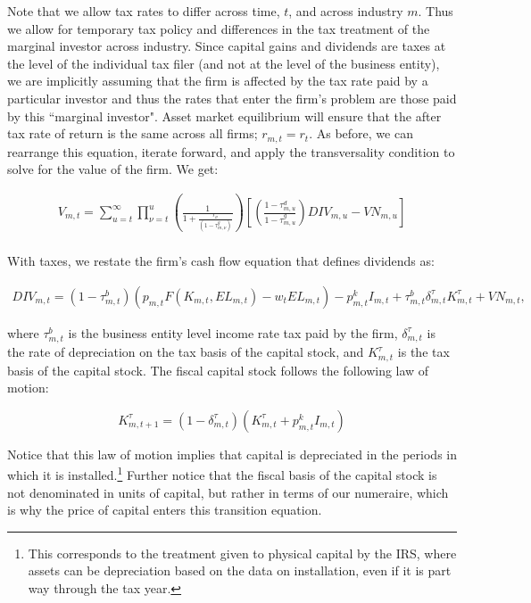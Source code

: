 \documentclass[letterpaper,12pt]{article}
\theoremstyle{definition}
\begin{document}
\begin{spacing}{1.5}
Note that we allow tax rates to differ across time, $t$, and across industry $m$. Thus we allow for temporary tax policy and differences in the tax treatment of the marginal investor across industry.  Since capital gains and dividends are taxes at the level of the individual tax filer (and not at the level of the business entity), we are implicitly assuming that the firm is affected by the tax rate paid by a particular investor and thus the rates that enter the firm's problem are those paid by this ``marginal investor".  Asset market equilibrium will ensure that the after tax rate of return is the same across all firms; $r_{m,t}=r_{t}$. As before, we can rearrange this equation, iterate forward, and apply the transversality condition to solve for the value of the firm.  We get:

\begin{equation}
\label{eqn:v_firm_tax2}
\begin{split}
 V_{m,t}= \sum_{u=t}^{\infty} \prod_{\nu=t}^{u}\left(\frac{1}{1+\frac{r_{\nu}}{(1-\tau^{g}_{m,\nu})}}\right)\left[ \left(\frac{1-\tau^{d}_{m,u}}{1-\tau^{g}_{m,u}}\right)DIV_{m,u}-VN_{m,u} \right] \\
\end{split}
\end{equation}

With taxes, we restate the firm's cash flow equation that defines dividends as: 

\begin{equation}
\label{eqn:div_tax}
\begin{split}
 DIV_{m,t}= (1-\tau^{b}_{m,t})\left(p_{m,t}F(K_{m,t},EL_{m,t})-w_{t}EL_{m,t}\right) - p^{k}_{m,t}I_{m,t} + \tau^{b}_{m,t}\delta^{\tau}_{m,t}K^{\tau}_{m,t}+ VN_{m,t},
 \end{split}
\end{equation}

\noindent\noindent where $\tau^{b}_{m,t}$ is the business entity level income rate tax paid by the firm, $\delta^{\tau}_{m,t}$ is the rate of depreciation on the tax basis of the capital stock, and $K^{\tau}_{m,t}$ is the tax basis of the capital stock.  The fiscal capital stock follows the following law of motion:

\begin{equation}
\label{eqn:tax_cap_lom}
K^{\tau}_{m,t+1} = (1-\delta^{\tau}_{m,t})(K^{\tau}_{m,t} + p^{k}_{m,t}I_{m,t})
\end{equation}

\noindent\noindent Notice that this law of motion implies that capital is depreciated in the periods in which it is installed.\footnote{This corresponds to the treatment given to physical capital by the IRS, where assets can be depreciation based on the data on installation, even if it is part way through the tax year.}  Further notice that the fiscal basis of the capital stock is not denominated in units of capital, but rather in terms of our numeraire, which is why the price of capital enters this transition equation.


\end{spacing}
\end{document}
